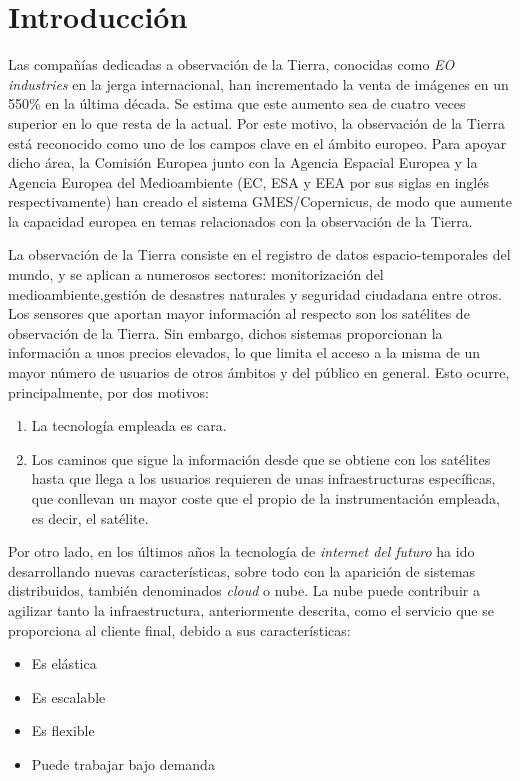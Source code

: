 \section{Introducción}
\label{sec:intro}

Las compañías dedicadas a observación de la Tierra, conocidas como \emph{EO industries} en la jerga internacional, han incrementado la venta de imágenes en un 550\% en la última década. Se estima que este aumento sea de cuatro veces superior en lo que resta de la actual. Por este motivo, la observación de la Tierra está reconocido como uno de los campos clave en el ámbito europeo. Para apoyar dicho área, la Comisión Europea junto con la Agencia Espacial Europea y la Agencia Europea del Medioambiente (EC, ESA y EEA por sus siglas en inglés respectivamente) han creado el sistema GMES/Copernicus, de modo que aumente la capacidad europea en temas relacionados con la observación de la Tierra.

La observación de la Tierra consiste en el registro de datos espacio-temporales del mundo, y se aplican a numerosos sectores: monitorización del medioambiente,gestión de desastres naturales y seguridad ciudadana entre otros. Los sensores que aportan mayor información al respecto son los satélites de observación de la Tierra. Sin embargo, dichos sistemas proporcionan la información a unos precios elevados, lo que limita el acceso a la misma de un mayor número de usuarios de otros ámbitos y del público en general. Esto ocurre, principalmente, por dos motivos:
\begin{enumerate}
\item La tecnología empleada es cara.
\item Los caminos que sigue la información desde que se obtiene con los satélites hasta que llega a los usuarios requieren de unas infraestructuras específicas, que conllevan un mayor coste que el propio de la instrumentación empleada, es decir, el satélite.
\end{enumerate}

Por otro lado, en los últimos años la tecnología de \emph{internet del futuro} ha ido desarrollando nuevas características, sobre todo con la aparición de sistemas distribuidos, también denominados \emph{cloud} o nube. La nube puede contribuir a agilizar tanto la infraestructura, anteriormente descrita, como el servicio que se proporciona al cliente final, debido a sus características:
\begin{itemize}
\item Es elástica
\item Es escalable
\item Es flexible
\item Puede trabajar bajo demanda
\end{itemize}

